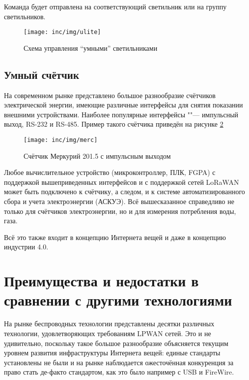 Команда будет отправлена на соответствующий светильник или на группу светильников.

\begin{figure}[!h]
  \centering
  \texttt{[image: inc/img/ulite]}
  \caption{Схема управления ``умными'' светильниками \cite{isbergsite}}
  \label{fig:ulite}
\end{figure}

\subsection{Умный счётчик}

На современном рынке представлено большое разнообразие счётчиков электрической 
энергии, имеющие различные интерфейсы для снятия показании внешними 
устройствами. 
Наиболее популярные интерфейсы ""--- импульсный выход, RS-232 и RS-485.
Пример такого счётчика приведён на рисунке \ref{fig:mercury}

\begin{figure}[!h]
  \centering
  \texttt{[image: inc/img/merc]}
  \caption{Счётчик Меркурий 201.5 с импульсным выходом}
  \label{fig:mercury}
\end{figure}

Любое вычислительное устройство (микроконтроллер, ПЛК, FGPA) с поддержкой 
вышеприведенных интерфейсов и с поддержкой сетей LoRaWAN может быть подключено к 
счётчику, а следом, и к системе автоматизированного сбора и учета 
электроэнергии (АСКУЭ).
Всё вышесказанное справедливо не только для счётчиков электроэнергии, но и для 
измерения потребления воды, газа.

Всё это также входит в концепцию Интернета вещей и даже в концепцию 
индустрии 4.0.



\section{Преимущества и недостатки в сравнении с другими технологиями}

На рынке беспроводных технологии представлены десятки различных технологии, удовлетворяющих требованиям LPWAN сетей.
Это и не удивительно, поскольку такое большое разнообразие объясняется текущим 
уровнем развития инфраструктуры Интернета вещей: единые стандарты установлены не 
были и на рынке наблюдается ожесточённая конкуренция за право стать де-факто 
стандартом, как это было например с USB и FireWire.

